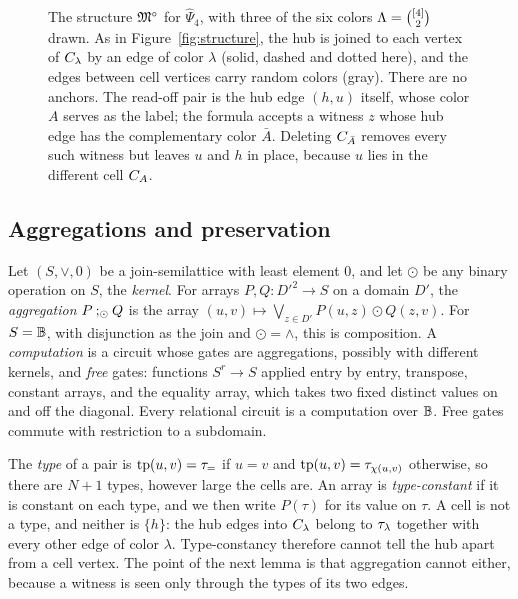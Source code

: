 \begin{figure}[t]
\caption{The structure $\mathfrak M^\circ$ for $\widehat\Psi_4$, with three of the
six colors $\Lambda=\binom{[4]}{2}$ drawn. As in Figure~\ref{fig:structure},
the hub is joined to each vertex of $C_{\lambda}$ by an edge of color
$\lambda$ (solid, dashed and dotted here), and the edges between cell
vertices carry random colors (gray). There are no anchors. The read-off
pair is the hub edge $(h,u)$ itself, whose color $A$ serves as the label;
the formula accepts a witness $z$ whose hub edge has the complementary
color $\bar A$. Deleting $C_{\bar A}$ removes every such witness but
leaves $u$ and $h$ in place, because $u$ lies in the different cell
$C_{A}$.}
\label{fig:af-structure}
\end{figure}

\subsection{Aggregations and preservation}\label{app:af-preservation}
Let $(S,\vee,0)$ be a join-semilattice with least element $0$, and let
$\odot$ be any binary operation on $S$, the \emph{kernel}. For arrays
$P,Q:D'^2\to S$ on a domain $D'$, the \emph{aggregation}
$P\mathbin{;_{\odot}} Q$ is the array
$(u,v)\mapsto\bigvee_{z\in D'}P(u,z)\odot Q(z,v)$. For $S=\mathbb B$, with
disjunction as the join and $\odot=\land$, this is composition. A
\emph{computation} is a circuit whose gates are aggregations, possibly
with different kernels, and \emph{free} gates: functions $S^r\to S$ applied
entry by entry, transpose, constant arrays, and the equality array, which
takes two fixed distinct values on and off the diagonal. Every relational
circuit is a computation over $\mathbb B$. Free gates commute with
restriction to a subdomain.

The \emph{type} of a pair is $\operatorname{tp}(u,v)=\tau_{=}$ if $u=v$ and
$\operatorname{tp}(u,v)=\tau_{\chi(u,v)}$ otherwise, so there are $N+1$ types, however
large the cells are. An array is \emph{type-constant} if it is constant on
each type, and we then write $P(\tau)$ for its value on $\tau$.
A cell is not a type, and neither is $\{h\}$: the hub edges into
$C_{\lambda}$ belong to $\tau_{\lambda}$ together with every other edge of
color $\lambda$. Type-constancy therefore cannot tell the hub apart from a
cell vertex. The point of the next lemma is that aggregation cannot either,
because a witness is seen only through the types of its two edges.

